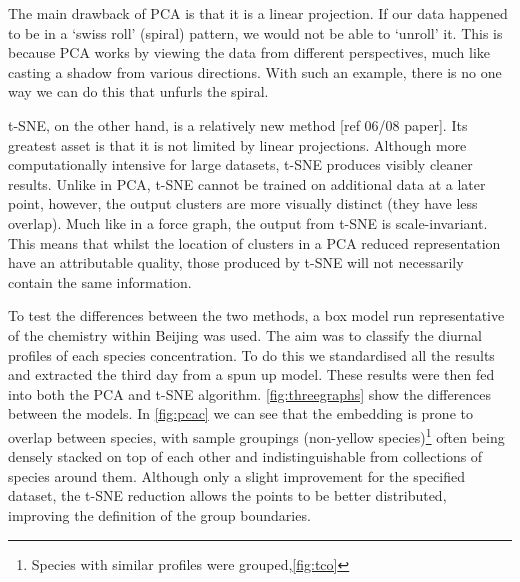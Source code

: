 The main drawback of PCA is that it is a linear projection. If our data happened to be in a `swiss roll' (spiral) pattern, we would not be able to `unroll' it. This is because PCA works by viewing the data from different perspectives, much like casting a shadow from various directions. With such an example, there is no one way we can do this that unfurls the spiral.

t-SNE, on the other hand, is a relatively new method [ref 06/08 paper]. Its greatest asset is that it is not limited by linear projections. Although more computationally intensive for large datasets, t-SNE produces visibly cleaner results. Unlike in PCA, t-SNE cannot be trained on additional data at a later point, however, the output clusters are more visually distinct (they have less overlap). Much like in a force graph, the output from t-SNE is scale-invariant. This means that whilst the location of clusters in a PCA reduced representation have an attributable quality, those produced by t-SNE will not necessarily contain the same information.

To test the differences between the two methods, a box model run representative of the chemistry within Beijing was used. The aim was to classify the diurnal profiles of each species concentration. To do this we standardised all the results and extracted the third day from a spun up model. These results were then fed into both the PCA and t-SNE algorithm. \autoref{fig:threegraphs} show the differences between the models. In \autoref{fig:pcac} we can see that the embedding is prone to overlap between species, with sample groupings (non-yellow species)\footnote{Species with similar profiles were grouped,\autoref{fig:tco} } often being densely stacked on top of each other and indistinguishable from collections of species around them. Although only a slight improvement for the specified dataset, the t-SNE reduction allows the points to be better distributed, improving the definition of the group boundaries.

